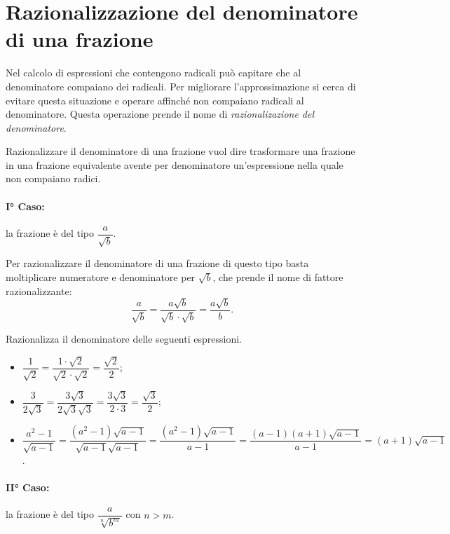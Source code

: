 \vspazio\ovalbox{\ref{ese:2.63}, \ref{ese:2.64}, \ref{ese:2.65}, \ref{ese:2.66}, \ref{ese:2.67}}

\section{Razionalizzazione del denominatore di una frazione}
Nel calcolo di espressioni che contengono radicali può capitare che al denominatore compaiano dei radicali. Per migliorare l'approssimazione si cerca di evitare questa situazione e operare affinché non compaiano radicali al denominatore. Questa operazione prende il nome di \emph{razionalizazione del denominatore}.

Razionalizzare il denominatore di una frazione vuol dire trasformare una frazione in una frazione equivalente avente per denominatore un’espressione nella quale non compaiano radici.

\paragraph{I° Caso:} la frazione è del tipo $\dfrac a{\sqrt b}$.

Per razionalizzare il denominatore di una frazione di questo tipo basta moltiplicare numeratore e denominatore per $\sqrt b$, che prende il nome di fattore razionalizzante: \[\dfrac {a} {\sqrt b} = \dfrac{a\sqrt b}{\sqrt b\cdot \sqrt b}=\dfrac{a\sqrt b}b.\]

\begin{exrig}
 \begin{esempio}
Razionalizza il denominatore delle seguenti espressioni.
\begin{itemize}
 \item $\dfrac 1{\sqrt 2}=\dfrac{1\cdot \sqrt 2}{\sqrt 2\cdot \sqrt 2}=\dfrac{\sqrt 2} 2$;
 \item $\dfrac 3{2\sqrt 3}=\dfrac{3\sqrt 3}{2\sqrt 3\sqrt 3}=\dfrac{3\sqrt 3}{2\cdot 3}=\dfrac{\sqrt 3} 2$;
 \item $\dfrac{a^2-1}{\sqrt{a-1}}=\dfrac{(a^2-1)\sqrt{a-1}}{\sqrt{a-1}\sqrt{a-1}}=\dfrac{(a^2-1)\sqrt{a-1}}{a-1}=\dfrac{(a-1)(a+1)\sqrt{a-1}}{a-1}=(a+1)\sqrt{a-1}$.
\end{itemize}
 \end{esempio}
\end{exrig}

\paragraph{II° Caso:} la frazione è del tipo $\dfrac a{\sqrt[n]{b^m}}$ con $n>m$.

